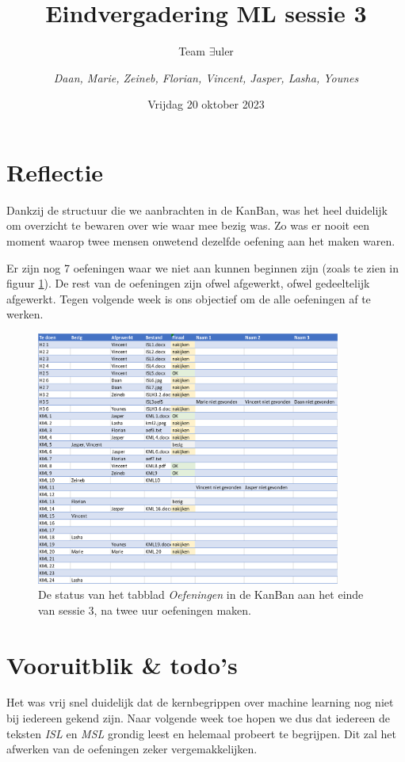\documentclass{article}
\title{Eindvergadering ML sessie 3}
\author{Team $\exists$uler \and
	\textit{Daan, Marie, Zeineb, Florian, Vincent, Jasper, Lasha, Younes}}
\date{Vrijdag 20 oktober 2023}
\begin{document}
	
\maketitle

\section*{Reflectie}

Dankzij de structuur die we aanbrachten in de KanBan, was het heel duidelijk om overzicht te bewaren over wie waar mee bezig was. Zo was er nooit een moment waarop twee mensen onwetend dezelfde oefening aan het maken waren.

Er zijn nog 7 oefeningen waar we niet aan kunnen beginnen zijn (zoals te zien in figuur \ref{fig:kanban}). De rest van de oefeningen zijn ofwel afgewerkt, ofwel gedeeltelijk afgewerkt. Tegen volgende week is ons objectief om de alle oefeningen af te werken.

\begin{figure}
	\centering
	\includegraphics[width=10cm]{kanban}
	\caption{De status van het tabblad \textit{Oefeningen} in de KanBan aan het einde van sessie 3, na twee uur oefeningen maken.}
	\label{fig:kanban}
\end{figure}

\section*{Vooruitblik  \& todo's}

Het was vrij snel duidelijk dat de kernbegrippen over machine learning nog niet bij iedereen gekend zijn. Naar volgende week toe hopen we dus dat iedereen de teksten \textit{ISL} en \textit{MSL} grondig leest en helemaal probeert te begrijpen. Dit zal het afwerken van de oefeningen zeker vergemakkelijken.
\end{document}
